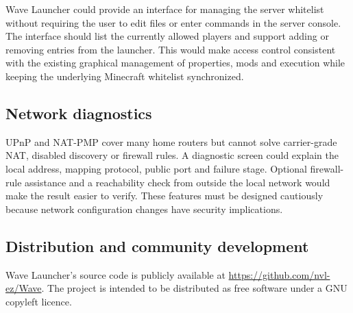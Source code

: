 Wave Launcher could provide an interface for managing the server whitelist without requiring the user to edit files or enter commands in the server console. The interface should list the currently allowed players and support adding or removing entries from the launcher. This would make access control consistent with the existing graphical management of properties, mods and execution while keeping the underlying Minecraft whitelist synchronized.

\subsection{Network diagnostics}

UPnP and NAT-PMP cover many home routers but cannot solve carrier-grade NAT, disabled discovery or firewall rules. A diagnostic screen could explain the local address, mapping protocol, public port and failure stage. Optional firewall-rule assistance and a reachability check from outside the local network would make the result easier to verify. These features must be designed cautiously because network configuration changes have security implications.

\subsection{Distribution and community development}

Wave Launcher's source code is publicly available at \url{https://github.com/nvl-ez/Wave}. The project is intended to be distributed as free software under a GNU copyleft licence.
